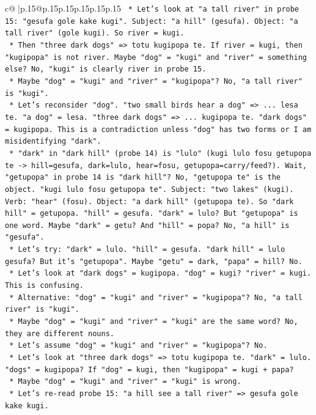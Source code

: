 \documentclass{article}
\begin{document}
{\begin{supertabular}{c@{$\;$}|p{.15\linewidth}@{}p{.15\linewidth}p{.15\linewidth}p{.15\linewidth}p{.15\linewidth}p{.15\linewidth}}
{{{\texttt{    *   Let's look at "a tall river" in probe 15: "gesufa gole kake kugi". Subject: "a hill" (gesufa). Object: "a tall river" (gole kugi). So river = kugi.} \\
\texttt{    *   Then "three dark dogs" => totu kugipopa te. If river = kugi, then "kugipopa" is not river. Maybe "dog" = "kugi" and "river" = something else? No, "kugi" is clearly river in probe 15.} \\
\texttt{    *   Maybe "dog" = "kugi" and "river" = "kugipopa"? No, "a tall river" is "kugi".} \\
\texttt{    *   Let's reconsider "dog". "two small birds hear a dog" => ... lesa te. "a dog" = lesa. "three dark dogs" => ... kugipopa te. "dark dogs" = kugipopa. This is a contradiction unless "dog" has two forms or I am misidentifying "dark".} \\
\texttt{    *   "dark" in "dark hill" (probe 14) is "lulo" (kugi lulo fosu getupopa te {-}> hill=gesufa, dark=lulo, hear=fosu, getupopa=carry/feed?). Wait, "getupopa" in probe 14 is "dark hill"? No, "getupopa te" is the object. "kugi lulo fosu getupopa te". Subject: "two lakes" (kugi). Verb: "hear" (fosu). Object: "a dark hill" (getupopa te). So "dark hill" = getupopa. "hill" = gesufa. "dark" = lulo? But "getupopa" is one word. Maybe "dark" = getu? And "hill" = popa? No, "a hill" is "gesufa".} \\
\texttt{    *   Let's try: "dark" = lulo. "hill" = gesufa. "dark hill" = lulo gesufa? But it's "getupopa". Maybe "getu" = dark, "papa" = hill? No.} \\
\texttt{    *   Let's look at "dark dogs" = kugipopa. "dog" = kugi? "river" = kugi. This is confusing.} \\
\texttt{    *   Alternative: "dog" = "kugi" and "river" = "kugipopa"? No, "a tall river" is "kugi".} \\
\texttt{    *   Maybe "dog" = "kugi" and "river" = "kugi" are the same word? No, they are different nouns.} \\
\texttt{    *   Let's assume "dog" = "kugi" and "river" = "kugipopa"? No.} \\
\texttt{    *   Let's look at "three dark dogs" => totu kugipopa te. "dark" = lulo. "dogs" = kugipopa? If "dog" = kugi, then "kugipopa" = kugi + papa?} \\
\texttt{    *   Maybe "dog" = "kugi" and "river" = "kugi" is wrong.} \\
\texttt{    *   Let's re{-}read probe 15: "a hill see a tall river" => gesufa gole kake kugi.} \\
}}}
\end{supertabular}}
\end{document}
